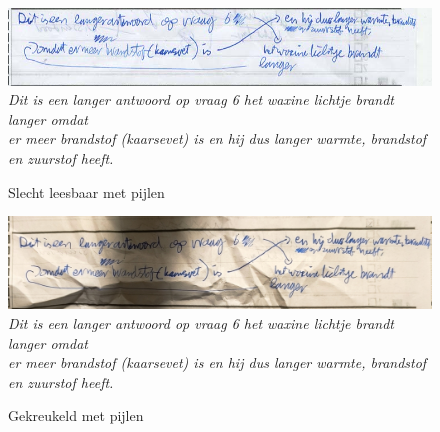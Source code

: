 \documentclass[12pt]{article}
\begin{document}
\begin{multicols}{2}
\begin{figure}[H]
    \label{fig:img-short-unreadable}
\end{figure}
\begin{figure}[H]
    \centering
    \includegraphics[width=1\linewidth]{./images/methoden/inscannen/tekst/slecht_leesbaar_pijlen.png}
    \textit{Dit is een langer antwoord op vraag 6 het waxine lichtje brandt langer omdat \\
er meer brandstof (kaarsevet) is en hij dus langer warmte, brandstof en zuurstof heeft.}
    \caption{Slecht leesbaar met pijlen}

    \label{fig:img-short-unreadable-arrow}
\end{figure}
\begin{figure}[H]
    \centering
    \includegraphics[width=1\linewidth]{./images/methoden/inscannen/tekst/gekreukeld_met_pijlen.png}
    \textit{Dit is een langer antwoord op vraag 6 het waxine lichtje brandt langer omdat \\
er meer brandstof (kaarsevet) is en hij dus langer warmte, brandstof en zuurstof heeft.}
    \caption{Gekreukeld met pijlen}
    \label{fig:img-wrinkeled-arrow}
\end{figure}

\end{multicols}
\pagebreak
\end{document}

